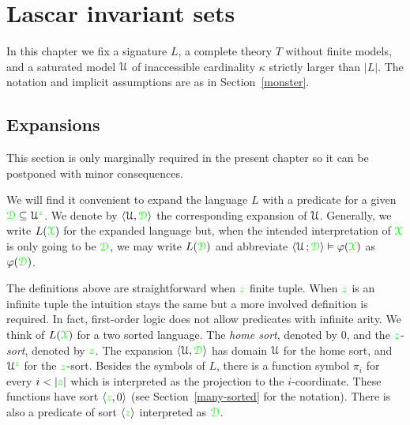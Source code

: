 \chapter{Lascar invariant sets}
\label{invariantL}

\def\medrel#1{\parbox[t]{6ex}{$\displaystyle\hfil #1$}}
\def\ceq#1#2#3{\parbox[t]{18ex}{$\displaystyle #1$}\medrel{#2}{$\displaystyle #3$}}

\def\mr{\color{brown}}
\def\gr{\color{green}}

In this chapter we fix a signature $L$, a complete theory $T$ without finite models, and a saturated model $\EuScript U$ of inaccessible cardinality $\kappa$ strictly larger than $|L|$.
The notation and implicit assumptions are as in Section~\ref{monster}.

\section{Expansions}
\label{expansions}

\def\ceq#1#2#3{\parbox[t]{16ex}{$\displaystyle #1$}\medrel{#2}{$\displaystyle #3$}}

This section is only marginally required in the present chapter so it can be postponed with minor consequences.

We will find it convenient to expand the language $L$ with a predicate for a given $\grD\subseteq\U^{\gr z}$.
We denote by $\<\U,\grD\>$ the corresponding expansion of $\EuScript U$.
Generally, we write \emph{$L({\gr\X})$} for the expanded language but, when the intended interpretation of ${\gr\X}$ is only going to be $\grD$, we may write \emph{$L(\grD)$} and abbreviate $\<\U\,;\grD\>\models\phi({\gr\X})$ as $\phi(\grD)$. 



\begin{remark}
The definitions above are straightforward when ${\gr z}$ finite tuple.
When ${\gr z}$ is an infinite tuple the intuition stays the same but a more involved definition is required.
In fact, first-order logic does not allow predicates with infinite arity.
We think of $L({\gr\X})$ for a two sorted language.
The \textit{home sort}, denoted by $0$, and the ${\gr z}$-\textit{sort}, denoted by ${\gr z}$.
The expansion $\<\U,\grD\>$ has domain $\EuScript U$ for the home sort, and $\U^{\gr z}$ for the ${\gr z}$-sort.
Besides the symbols of $L$, there is a function symbol $\pi_i$ for every $i<|{\gr z}|$ which is interpreted as the projection to the $i$-coordinate.
These functions have sort $\<{\gr z},0\>$ (see Section~\ref{many-sorted} for the notation).
There is also a predicate of sort $\<{\gr z}\>$ interpreted as $\grD$.
\end{remark}

